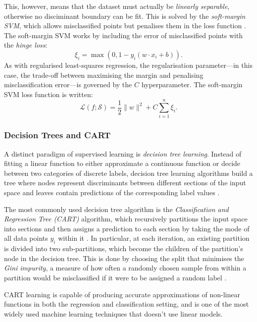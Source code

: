 \documentclass{report}
\begin{document}
This, however, means that the dataset must actually be \textit{linearly separable}, otherwise no disciminant boundary can be fit. This is solved by the \textit{soft-margin SVM}, which allows misclassified points but penalises them in the loss function \cite{hastie2009elements}. The soft-margin SVM works by including the error of misclassified points with the \textit{hinge loss}:
\begin{equation}
    \xi_i = \max(0, 1 - y_i (w \cdot x_i + b)).
\end{equation}
As with regularised least-squares regression, the regularisation parameter—in this case, the trade-off between maximising the margin and penalising misclassification error—is governed by the $C$ hyperparameter. The soft-margin SVM loss function is written:
\begin{equation}
    \mathcal L(f; \mathcal S) = \frac{1}{2} \lVert w \rVert^2 + C \sum_{i=1}^n \xi_i.
\end{equation}


\subsubsection{Decision Trees and CART}

A distinct paradigm of supervised learning is \textit{decision tree learning}. Instead of fitting a linear function to either approximate a continuous function or decide between two categories of discrete labels, decision tree learning algorithms build a tree where nodes represent discriminants between different sections of the input space and leaves contain predictions of the corresponding label values \cite{hastie2009elements}.

The most commonly used decision tree algorithm is the \textit{Classification and Regression Tree (CART)} algorithm, which recursively partitions the input space into sections and then assigns a prediction to each section by taking the mode of all data points $y_i$ within it \cite{hastie2009elements}. In particular, at each iteration, an existing partition is divided into two sub-partitions, which become the children of the partition's node in the decision tree. This is done by choosing the split that minimises the \textit{Gini impurity}, a measure of how often a randomly chosen sample from within a partition would be misclassified if it were to be assigned a random label \cite{hastie2009elements}.

CART learning is capable of producing accurate approximations of non-linear functions in both the regression and classification setting, and is one of the most widely used machine learning techniques that doesn't use linear models.
\end{document}
